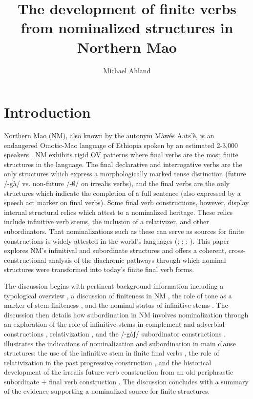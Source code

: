 \documentclass[output=paper]{langsci/langscibook}
\title{The development of finite verbs from nominalized structures in Northern Mao}
\author{%
 Michael Ahland \affiliation{California State University, Long Beach}
}
\begin{document}
\section{Introduction}
Northern Mao (NM), also known by the autonym Màwés Aats'è, is an endangered Omotic-Mao language of Ethiopia \citep{Bender2000} spoken by an estimated 2-3,000 speakers \citep[13]{AhlandM2012}. NM exhibits rigid OV patterns where final verbs are the most finite structures in the language. The final declarative and interrogative verbs are the only structures which express a morphologically marked tense distinction (future /-gà/ vs. non-future /-${\emptyset}$/ on irrealis verbs), and the final verbs are the only structures which indicate the completion of a full sentence (also expressed by a speech act marker on final verbs). Some final verb constructions, however, display internal structural relics which attest to a nominalized heritage. These relics include infinitive verb stems, the inclusion of a relativizer, and other subordinators. That nominalizations such as these can serve as sources for finite constructions is widely attested in the world's languages (\citealt{Gildea1993}; \citealt{DeLancey2011}; \citealt[68]{Givon2009}; \citealt[382]{Noonan1997}). This paper explores NM's infinitival and subordinate structures and offers a coherent, cross-constructional analysis of the diachronic pathways through which nominal structures were transformed into today's finite final verb forms.

The discussion begins with pertinent background information including a typological overview , a discussion of finiteness in NM , the role of tone as a marker of stem finiteness , and the nominal status of infinitive stems . The discussion then details how subordination in NM involves nominalization through an exploration of the role of infinitive stems in complement and adverbial constructions , relativization , and the /-gàʃ/ subordinator constructions .  illustrates the indications of nominalization and subordination in main clause structures: the use of the infinitive stem in finite final verbs , the role of relativization in the past progressive construction , and the historical development of the irrealis future verb construction from an old periphrastic subordinate + final verb construction . The discussion concludes with a summary of the evidence supporting a nominalized source for finite structures. 
\end{document}
